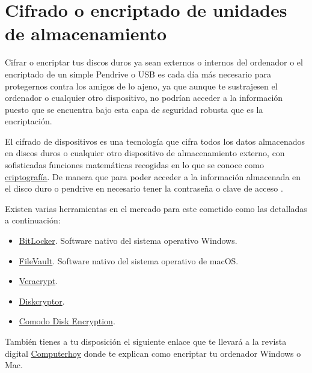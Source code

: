 \documentclass[
  a4paper,
  openany]{book}
\begin{document}
\hypertarget{cifrado-o-encriptado-de-unidades-de-almacenamiento}{%
\section{Cifrado o encriptado de unidades de almacenamiento}\label{cifrado-o-encriptado-de-unidades-de-almacenamiento}}

Cifrar o encriptar tus discos duros ya sean externos o internos del ordenador o el encriptado de un simple Pendrive o USB es cada día más necesario para protegernos contra los amigos de lo ajeno, ya que aunque te sustrajesen el ordenador o cualquier otro dispositivo, no podrían acceder a la información puesto que se encuentra bajo esta capa de seguridad robusta que es la encriptación.

El cifrado de dispositivos es una tecnología que cifra todos los datos almacenados en discos duros o cualquier otro dispositivo de almacenamiento externo, con sofisticadas funciones matemáticas recogidas en lo que se conoce como \href{https://es.wikipedia.org/wiki/Criptografía}{criptografía}. De manera que para poder acceder a la información almacenada en el disco duro o pendrive en necesario tener la contraseña o clave de acceso \citep{cifrado}.

Existen varias herramientas en el mercado para este cometido como las detalladas a continuación:

\begin{itemize}
\item
  \href{https://docs.microsoft.com/es-es/windows/security/information-protection/bitlocker/bitlocker-overview}{BitLocker}. Software nativo del sistema operativo Windows.
\item
  \href{https://support.apple.com/es-es/HT204837}{FileVault}. Software nativo del sistema operativo de macOS.
\item
  \href{https://www.veracrypt.fr}{Veracrypt}.
\item
  \href{https://diskcryptor.org/}{Diskcryptor}.
\item
  \href{https://www.comodo.com/home/internet-security/disk-encryption.php}{Comodo Disk Encryption}.
\end{itemize}

También tienes a tu disposición el siguiente enlace que te llevará a la revista digital \href{https://computerhoy.com/tutoriales/tecnologia/como-cifrar-disco-duro-memoria-externa-nadie-pueda-acceder-ella-386434}{Computerhoy} donde te explican como encriptar tu ordenador Windows o Mac.
\end{document}
